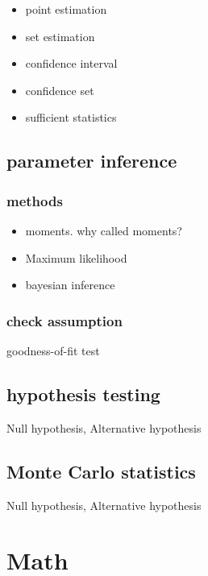 \documentclass[10pt,a4paper]{book}
\begin{document}
\begin{itemize}
	\item point estimation
	\item set estimation
	\item confidence interval
	\item confidence set
	\item sufficient statistics

\end{itemize}


\section {parameter inference}

\subsection {methods}
\begin{itemize}
	\item moments. why called moments?
	\item Maximum likelihood
	\item bayesian inference
\end{itemize}

\subsection {check assumption}
goodness-of-fit test

\section {hypothesis testing}
Null hypothesis, Alternative hypothesis

\section {Monte Carlo statistics}
Null hypothesis, Alternative hypothesis

\chapter{Math}
\end{document}
